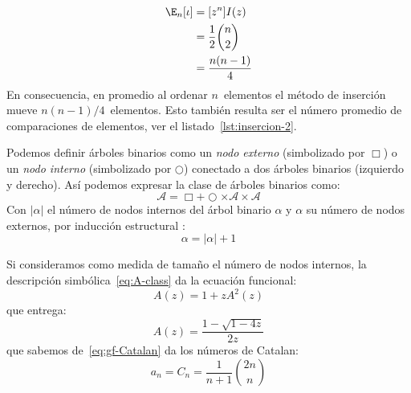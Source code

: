   \begin{align}
    \E_n[\iota]
      &= [z^n] I(z)
	   \label{En-iota} \\
      &= \frac{1}{2} \binom{n}{2}
	   \notag \\
      &= \frac{n (n - 1)}{4}
	  \label{En-iota-explicit}
  \end{align}
  En consecuencia,
  en promedio al ordenar \(n\)~elementos
  el método de inserción mueve \(n (n - 1) / 4\)~elementos.
  Esto también resulta ser el número promedio de comparaciones de elementos,
  ver el listado~\ref{lst:insercion-2}.

  Podemos definir árboles binarios como un \emph{nodo externo}%
  (simbolizado por \(\Box\))
  o un \emph{nodo interno}%
  (simbolizado por \(\Circle\))
  conectado a dos árboles binarios
  (izquierdo y derecho).
  Así podemos expresar la clase de árboles binarios como:
  \begin{equation}
    \label{eq:A-class}
    \mathcal{A}
      = \Box + \Circle \times \mathcal{A} \times \mathcal{A}
  \end{equation}
  Con \(\lvert \alpha \rvert\) el número de nodos internos%
  del árbol binario \(\alpha\)
  y \(\boxed{\alpha}\) su número de nodos externos,%
  por inducción estructural%
    :
  \begin{equation}
    \label{eq:A-internal-external-size}
    \boxed{\alpha}
      = \lvert \alpha \rvert + 1
  \end{equation}

  Si consideramos como medida de tamaño el número de nodos internos,
  la descripción simbólica~\eqref{eq:A-class} da la ecuación funcional:
  \begin{equation}
    \label{eq:A-fe}
    A(z)
      = 1 + z A^2(z)
  \end{equation}
  que entrega:
  \begin{equation}
    \label{eq:A-explicit}
    A(z)
      = \frac{1 - \sqrt{1 - 4 z}}{2 z}
  \end{equation}
  que sabemos de~\eqref{eq:gf-Catalan} da los números de Catalan:%
  \begin{equation}
    \label{eq:A-coeff}
    a_n
      = C_n
      = \frac{1}{n + 1} \binom{2 n}{n}
  \end{equation}

